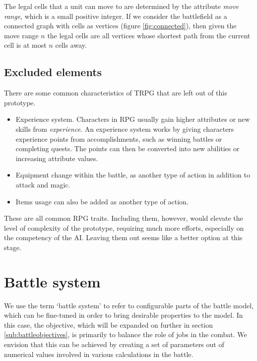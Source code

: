 The legal cells that a unit can move to are determined by the attribute \textit{move range}, which is a small positive integer. If we consider the battlefield as a connected graph with cells as vertices (figure \ref{fig:connected}), then given the move range $n$ the legal cells are all vertices whose shortest path from the current cell is at most $n$ cells away.

\subsection{Excluded elements}

There are some common characteristics of TRPG that are left out of this prototype.

\begin{itemize}

\item Experience system. Characters in RPG usually gain higher attributes or new skills from \textit{experience}. An experience system works by giving characters experience points from accomplishments, such as winning battles or completing quests. The points can then be converted into new abilities or increasing attribute values.

\item Equipment change within the battle, as another type of action in addition to attack and magic.

\item Items usage can also be added as another type of action.

\end{itemize}

 These are all common RPG traits. Including them, however, would elevate the level of complexity of the prototype, requiring much more efforts, especially on the competency of the AI. Leaving them out seems like a better option at this stage.

\section{Battle system}
\label{sub:battlesystemdesign}

We use the term `battle system' to refer to configurable parts of the battle model, which can be fine-tuned in order to bring desirable properties to the model. In this case, the objective, which will be expanded on further in section \ref{sub:battleobjectives}, is primarily to balance the role of jobs in the combat. We envision that this can be achieved by creating a set of parameters out of numerical values involved in various calculations in the battle. 

